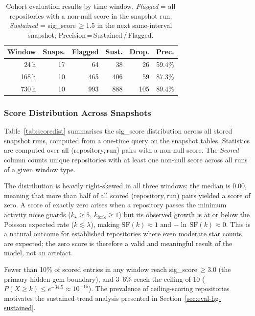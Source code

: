 \documentclass[sigconf]{acmart}
\begin{document}
\begin{table}[ht]
  \caption{Cohort evaluation results by time window. \emph{Flagged} = all
    repositories with a non-null score in the snapshot run; \emph{Sustained} =
    sig\_score\,$\geq 1.5$ in the next same-interval snapshot;
    Precision\,=\,Sustained\,/\,Flagged.}
  \label{tab:cohort}
  \centering
  \begin{tabular}{r r r r r r}
    \toprule
    \textbf{Window} & \textbf{Snaps.} & \textbf{Flagged} & \textbf{Sust.} & \textbf{Drop.} & \textbf{Prec.} \\
    \midrule
    24\,h  & 17 &  64 &  38 &  26 & 59.4\% \\
    168\,h & 10 & 465 & 406 &  59 & 87.3\% \\
    730\,h & 10 & 993 & 888 & 105 & 89.4\% \\
    \bottomrule
  \end{tabular}
\end{table}

\subsubsection{Score Distribution Across Snapshots}

Table~\ref{tab:scoredist} summarises the sig\_score distribution across all
stored snapshot runs, computed from a one-time query on the snapshot tables.
Statistics are computed over all (repository,\,run) pairs with a non-null score.
The \emph{Scored} column counts unique repositories with at least one non-null
score across all runs of a given window type.

The distribution is heavily right-skewed in all three windows: the median is
0.00, meaning that more than half of all scored (repository,\,run) pairs
yielded a score of zero. A score of exactly zero arises when a repository passes
the minimum activity noise guards ($k_\star \geq 5$, $k_\mathrm{fork} \geq 1$)
but its observed growth is at or below the Poisson expected rate ($k \lesssim
\lambda$), making $\mathrm{SF}(k) \approx 1$ and $-\ln\,\mathrm{SF}(k) \approx
0$. This is a natural outcome for established repositories where even moderate
star counts are expected; the zero score is therefore a valid and meaningful
result of the model, not an artefact.

Fewer than 10\% of scored entries in any window reach sig\_score\,$\geq 3.0$
(the primary hidden-gem boundary), and 3--6\% reach the ceiling of 10 ($P(X
\geq k) \leq e^{-34.5} \approx 10^{-15}$). The prevalence of ceiling-scoring
repositories motivates the sustained-trend analysis presented in
Section~\ref{sec:eval-hg-sustained}.
\end{document}
